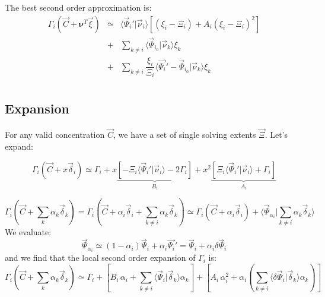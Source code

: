 \documentclass[aps,12pt]{revtex4}
\begin{document}
The best second order approximation is:
\begin{equation}
\begin{array}{rcl}
		\Gamma_i(\vec{C}+\bm{\nu}^T \vec{\xi}) & \simeq  & 
		\langle \vec{\Psi}_i' \vert \vec{\nu}_i \rangle \left[ (\xi_i - \Xi_i)  + A_i (\xi_i - \Xi_i)^2 \right] \\
 & + & \sum_{k\not=i} \langle \vec{\Psi}_{i_0} \vert \vec{\nu}_k \rangle \xi_k\\
 & + & \sum_{k\not=i}   \dfrac{\xi_i}{\Xi_i} \langle  \vec{\Psi_i}' - \vec{\Psi}_{i_0} \vert \vec{\nu}_k \rangle \xi_k\\
\end{array}
\end{equation}



\subsection{Expansion}

For any valid concentration $\vec{C}$, we have a set of single solving extents $\vec{\Xi}$.
Let's expand:

\begin{equation}
	\Gamma_i(\vec{C} + x \vec{\delta}_i) \simeq \Gamma_i 
	+ x \underbrace{\left[ -\Xi_i \langle \vec{\Psi}_i' \vert \vec{\nu}_i \rangle - 2 \Gamma_i \right]}_{B_i}
	+ x^2 \underbrace{\left[ \Xi_i \langle \vec{\Psi}_i' \vert \vec{\nu}_i \rangle + \Gamma_i\right]}_{A_i}
\end{equation}

\begin{equation}
	\Gamma_i(\vec{C} + \sum_k \alpha_k \vec{\delta}_k ) 
	=
	\Gamma_i \left(\vec{C} + \alpha_i \vec{\delta}_i + \sum_{k\not=i} \alpha_k \vec{\delta}_k \right)
	\simeq
	\Gamma_i(\vec{C}+\alpha_i \vec{\delta}_i) + \langle \vec{\Psi}_{\alpha_i} \vert \sum_{k\not=i} \alpha_k \vec{\delta}_k \rangle
\end{equation}
We evaluate:
\begin{equation}
	\vec{\Psi}_{\alpha_i} \simeq (1-\alpha_i) \vec{\Psi}_i + \alpha_i \vec{\Psi_i}' = \vec{\Psi}_i + \alpha_i \delta\vec{\Psi}_i
\end{equation}
and we find that the local second order expansion of $\Gamma_i$ is:
\begin{equation}
	\Gamma_i(\vec{C} + \sum_k \alpha_k \vec{\delta}_k ) 
	\simeq
	\Gamma_i +
	\left[ 
	 B_i \, \alpha_i + \sum_{k\not=i} \langle \vec{\Psi}_i \vert \vec{\delta}_k \rangle \alpha_k
	\right]
	+ \left[ A_i \, \alpha_i^2 + \alpha_i \left( \sum_{k\not=i} \langle \delta\vec{\Psi}_i \vert \vec{\delta}_k \rangle \alpha_k \right) \right]
\end{equation}
\end{document}
